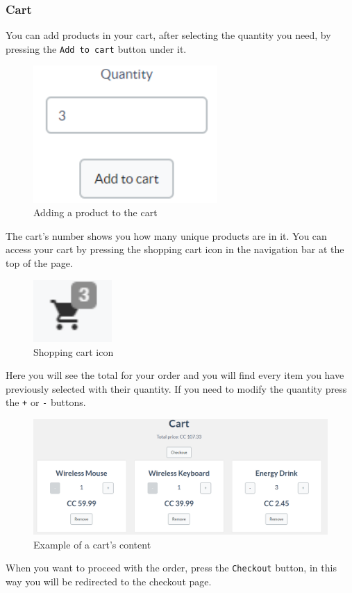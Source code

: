 		\subsubsection{Cart}
		You can add products in your cart, after selecting the quantity you 
		need, by pressing the \texttt{Add to cart} button under it.
		\begin{figure}[H]
			\includegraphics[width=7cm]{res/images/add_to_cart.png}
			\centering
			\caption{Adding a product to the cart}
		\end{figure}
		\noindent The cart's number shows you how many unique products 
		are in it. You can access your cart by pressing the shopping cart icon 
		in the navigation bar at the top of the page.
		\begin{figure}[H]
			\includegraphics[width=3cm]{res/images/cart_icon.png}
			\centering
			\caption{Shopping cart icon}
		\end{figure}
		\noindent Here you will see the total for your order and you will find 
		every item you have previously selected with their quantity. If you 
		need to modify the quantity press the \texttt{+} or \texttt{-} buttons.
		\begin{figure}[H]
			\includegraphics[width=15cm]{res/images/cart_example.png}
			\centering
			\caption{Example of a cart's content}
		\end{figure}
		\noindent When you want to proceed with the order, press the \texttt{Checkout} 
		button, in this way you will be redirected to the checkout page.

